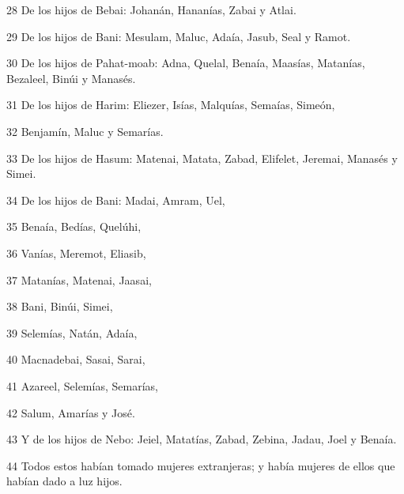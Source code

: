 \par 28 De los hijos de Bebai: Johanán, Hananías, Zabai y Atlai.
\par 29 De los hijos de Bani: Mesulam, Maluc, Adaía, Jasub, Seal y Ramot. 
\par 30 De los hijos de Pahat-moab: Adna, Quelal, Benaía, Maasías, Matanías, Bezaleel, Binúi y Manasés.
\par 31 De los hijos de Harim: Eliezer, Isías, Malquías, Semaías, Simeón,
\par 32 Benjamín, Maluc y Semarías.
\par 33 De los hijos de Hasum: Matenai, Matata, Zabad, Elifelet, Jeremai, Manasés y Simei.
\par 34 De los hijos de Bani: Madai, Amram, Uel,
\par 35 Benaía, Bedías, Quelúhi,
\par 36 Vanías, Meremot, Eliasib,
\par 37 Matanías, Matenai, Jaasai,
\par 38 Bani, Binúi, Simei,
\par 39 Selemías, Natán, Adaía,
\par 40 Macnadebai, Sasai, Sarai,
\par 41 Azareel, Selemías, Semarías,
\par 42 Salum, Amarías y José.
\par 43 Y de los hijos de Nebo: Jeiel, Matatías, Zabad, Zebina, Jadau, Joel y Benaía.
\par 44 Todos estos habían tomado mujeres extranjeras; y había mujeres de ellos que habían dado a luz hijos.

